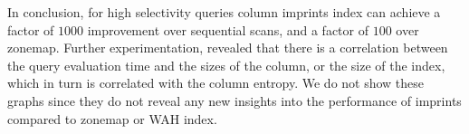 In conclusion, for high selectivity queries column imprints index can achieve a
factor of $1000$ improvement over sequential scans, and a factor of $100$ over
zonemap. Further experimentation, revealed that there is a correlation between
the query evaluation time and the sizes of the column, or the size of the
index, which in turn is correlated with the column entropy. We do not show
these graphs since they do not reveal any new insights into the performance of
imprints compared to zonemap or WAH index.
